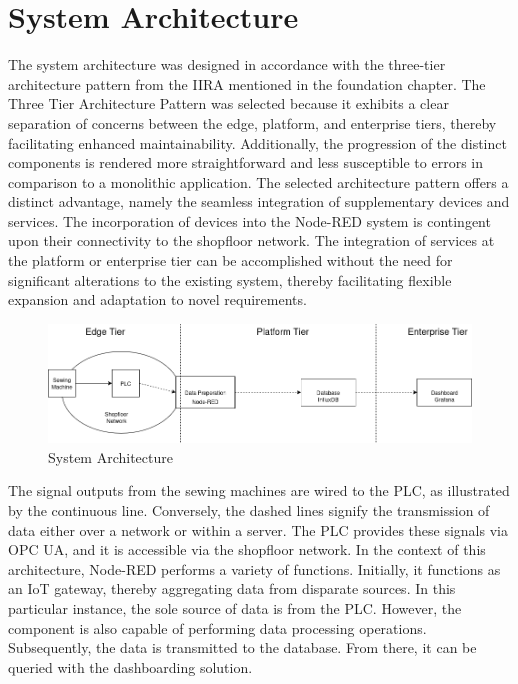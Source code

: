 {\section{System Architecture}
The system architecture was designed in accordance with the three-tier architecture pattern from the IIRA mentioned in the foundation chapter. The Three Tier Architecture Pattern was selected because it exhibits a clear separation of concerns between the edge, platform, and enterprise tiers, thereby facilitating enhanced maintainability. Additionally, the progression of the distinct components is rendered more straightforward and less susceptible to errors in comparison to a monolithic application. The selected architecture pattern offers a distinct advantage, namely the seamless integration of supplementary devices and services. The incorporation of devices into the Node-RED system is contingent upon their connectivity to the shopfloor network. The integration of services at the platform or enterprise tier can be accomplished without the need for significant alterations to the existing system, thereby facilitating flexible expansion and adaptation to novel requirements.
\begin{figure}[H]
	\includegraphics[width=\linewidth]{pic/system_overview.png}
	\caption{System Architecture}
	\label{fig:Model-Component-Pattern}
\end{figure}
The signal outputs from the sewing machines are wired to the PLC, as illustrated by the continuous line. Conversely, the dashed lines signify the transmission of data either over a network or within a server. The PLC provides these signals via OPC UA, and it is accessible via the shopfloor network. In the context of this architecture, Node-RED performs a variety of functions. Initially, it functions as an IoT gateway, thereby aggregating data from disparate sources. In this particular instance, the sole source of data is from the PLC. However, the component is also capable of performing data processing operations.  Subsequently, the data is transmitted to the database. From there, it can be queried with the dashboarding solution. 


}
